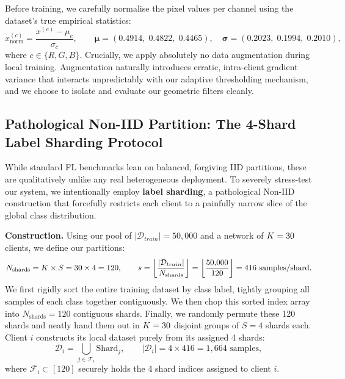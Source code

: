 \documentclass[../main.tex]{subfiles}
\begin{document}
Before training, we carefully normalise the pixel values per channel using the dataset's true empirical statistics:
\begin{equation}
    x_{\text{norm}}^{(c)} = \frac{x^{(c)} - \mu_c}{\sigma_c}, \qquad
    \boldsymbol{\mu} = (0.4914,\; 0.4822,\; 0.4465), \quad
    \boldsymbol{\sigma} = (0.2023,\; 0.1994,\; 0.2010),
    \label{eq:cifar_norm}
\end{equation}
where $c \in \{R, G, B\}$. Crucially, we apply absolutely no data augmentation during local training. Augmentation naturally introduces erratic, intra-client gradient variance that interacts unpredictably with our adaptive thresholding mechanism, and we choose to isolate and evaluate our geometric filters cleanly.

\subsection{Pathological Non-IID Partition: The 4-Shard Label Sharding Protocol}
\label{sec:exp_noniid}

While standard FL benchmarks lean on balanced, forgiving IID partitions, these are qualitatively unlike any real heterogeneous deployment. To severely stress-test our system, we intentionally employ \textbf{label sharding}, a pathological Non-IID construction \citep{mcmahan2017communication} that forcefully restricts each client to a painfully narrow slice of the global class distribution.

\textbf{Construction.} Using our pool of $|\mathcal{D}_{train}| = 50{,}000$ and a network of $K = 30$ clients, we define our partitions:
\begin{equation}
    N_{\text{shards}} = K \times S = 30 \times 4 = 120, \qquad
    s = \left\lfloor \frac{|\mathcal{D}_{train}|}{N_{\text{shards}}} \right\rfloor = \left\lfloor \frac{50{,}000}{120} \right\rfloor = 416 \text{ samples/shard.}
    \label{eq:exp_shard_size}
\end{equation}
We first rigidly sort the entire training dataset by class label, tightly grouping all samples of each class together contiguously. We then chop this sorted index array into $N_{\text{shards}} = 120$ contiguous shards. Finally, we randomly permute these 120 shards and neatly hand them out in $K = 30$ disjoint groups of $S = 4$ shards each. Client $i$ constructs its local dataset purely from its assigned 4 shards:
\begin{equation}
    \mathcal{D}_i = \bigcup_{j \in \mathcal{F}_i} \text{Shard}_j,
    \qquad |\mathcal{D}_i| = 4 \times 416 = 1{,}664 \text{ samples},
    \label{eq:client_dataset}
\end{equation}
where $\mathcal{F}_i \subset [120]$ securely holds the 4 shard indices assigned to client $i$.
\end{document}
